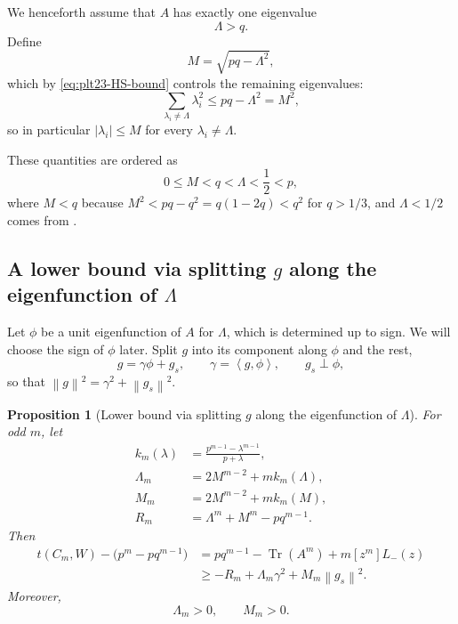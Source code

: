 \documentclass[11pt]{article}
\newtheorem{proposition}[theorem]{Proposition}
\numberwithin{equation}{section}
\newcommand{\ip}[2]{\left\langle #1,#2\right\rangle}
\newcommand{\norm}[1]{\left\lVert #1\right\rVert}
\newcommand{\Tr}{\operatorname{Tr}}
\begin{document}
We henceforth assume that $A$ has exactly one eigenvalue
\begin{equation}\label{eq:plt23-Lambda-above-q}
  \Lambda>q.
\end{equation}
Define
\begin{equation}\label{eq:plt23-M-def}
  M=\sqrt{pq-\Lambda^2},
\end{equation}
which by \eqref{eq:plt23-HS-bound} controls the remaining eigenvalues:
\[
  \sum_{\lambda_i\ne\Lambda}\lambda_i^2\le pq-\Lambda^2=M^2,
\]
so in particular $|\lambda_i|\le M$ for every $\lambda_i\ne\Lambda$.

These quantities are ordered as
\begin{equation}\label{eq:plt23-M-Lambda-order}
  0\le M<q<\Lambda<\frac{1}{2}<p,
\end{equation}
where $M<q$ because $M^2<pq-q^2=q(1-2q)<q^2$ for $q>1/3$, and
$\Lambda<1/2$ comes from .

\subsection{A lower bound via splitting \texorpdfstring{$g$}{g} along the
eigenfunction of \texorpdfstring{$\Lambda$}{Lambda}}\label{subsec:plt23-splitting-lower-bound}

Let $\phi$ be a unit eigenfunction of $A$ for $\Lambda$, which is determined up to sign. 
We will choose the sign of $\phi$ later.  
Split $g$ into its component along $\phi$ and the rest,
\begin{equation}\label{eq:plt23-g-decomp}
  g=\gamma\phi+g_s,
  \qquad \gamma=\ip g\phi,
  \qquad g_s\perp\phi,
\end{equation}
so that $\norm g^2=\gamma^2+\norm{g_s}^2$.

\begin{proposition}[Lower bound via splitting $g$ along the eigenfunction of $\Lambda$]\label{prop:plt23-splitting-lower-bound}
  For odd $m$, let
  \begin{align}
    k_m(\lambda)&=\frac{p^{m-1}-\lambda^{m-1}}{p+\lambda},
    \label{eq:plt23-km-def}\\
    \Lambda_m&=2M^{m-2}+mk_m(\Lambda),\label{eq:plt23-Lambdam-def}\\
    M_m&=2M^{m-2}+mk_m(M),\label{eq:plt23-Mm-def}\\
    R_m&=\Lambda^m+M^m-pq^{m-1}.\label{eq:plt23-Rm-def}
  \end{align}
  Then
  \begin{align}
    t(C_m,W)-\bigl(p^m-pq^{m-1}\bigr)
    &= pq^{m-1} - \Tr(A^m)+m[z^m]L_-(z) \nonumber
    \\
    {} &\ge -R_m+\Lambda_m\gamma^2+M_m\norm{g_s}^2.\label{eq:plt23-splitting-lower-bound}
  \end{align}
  Moreover,
  \begin{equation}\label{eq:plt23-Lambdam-Mm-positive}
    \Lambda_m>0,
    \qquad
    M_m>0.
  \end{equation}
\end{proposition}
\end{document}
